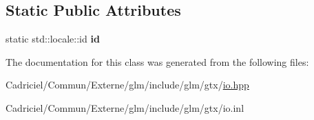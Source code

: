 \subsection*{Static Public Attributes}
\begin{DoxyCompactItemize}
\item 
static std\+::locale\+::id {\bfseries id}\hypertarget{classglm_1_1io_1_1format__punct_a763f60aeaecec9290917ed1d83b79838}{}\label{classglm_1_1io_1_1format__punct_a763f60aeaecec9290917ed1d83b79838}

\end{DoxyCompactItemize}


The documentation for this class was generated from the following files\+:\begin{DoxyCompactItemize}
\item 
Cadriciel/\+Commun/\+Externe/glm/include/glm/gtx/\hyperlink{io_8hpp}{io.\+hpp}\item 
Cadriciel/\+Commun/\+Externe/glm/include/glm/gtx/io.\+inl\end{DoxyCompactItemize}
